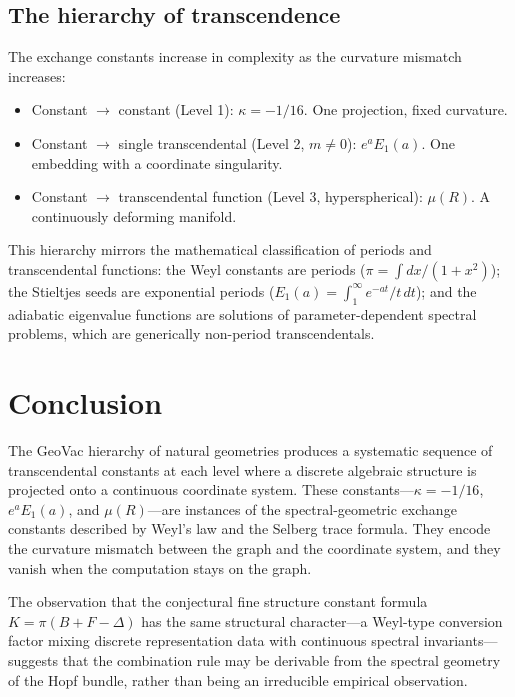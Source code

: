 \documentclass[aps,pra,twocolumn,superscriptaddress,longbibliography]{revtex4-2}
\begin{document}
\subsection{The hierarchy of transcendence}

The exchange constants increase in complexity as the curvature
mismatch increases:
\begin{itemize}
  \item Constant $\to$ constant (Level 1): $\kappa = -1/16$.
    One projection, fixed curvature.
  \item Constant $\to$ single transcendental (Level 2, $m \neq 0$):
    $e^a E_1(a)$.  One embedding with a coordinate singularity.
  \item Constant $\to$ transcendental function (Level 3, hyperspherical):
    $\mu(R)$.  A continuously deforming manifold.
\end{itemize}

This hierarchy mirrors the mathematical classification of periods
and transcendental functions: the Weyl constants are periods
($\pi = \int dx/(1+x^2)$); the Stieltjes seeds are exponential
periods ($E_1(a) = \int_1^\infty e^{-at}/t\,dt$); and the
adiabatic eigenvalue functions are solutions of parameter-dependent
spectral problems, which are generically non-period transcendentals.



\section{Conclusion}
\label{sec:conclusion}

The GeoVac hierarchy of natural geometries produces a systematic
sequence of transcendental constants at each level where a
discrete algebraic structure is projected onto a continuous
coordinate system.  These constants---$\kappa = -1/16$,
$e^a E_1(a)$, and $\mu(R)$---are instances of the
spectral-geometric exchange constants described by Weyl's law
and the Selberg trace formula.  They encode the curvature
mismatch between the graph and the coordinate system, and they
vanish when the computation stays on the graph.

The observation that the conjectural fine structure constant
formula $K = \pi(B + F - \Delta)$ has the same structural
character---a Weyl-type conversion factor mixing discrete
representation data with continuous spectral invariants---suggests
that the combination rule may be derivable from the spectral
geometry of the Hopf bundle, rather than being an irreducible
empirical observation.
\end{document}
